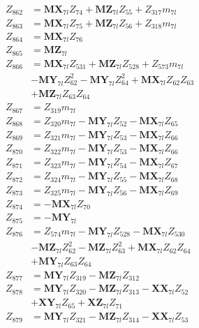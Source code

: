 \begin{multicols}{2}
\begin{align}
Z_{862} &= \mathbf{MX}_{7l}Z_{74} + \mathbf{MZ}_{7l}Z_{55} + Z_{317}m_{7l} \nonumber \\
Z_{863} &= \mathbf{MX}_{7l}Z_{75} + \mathbf{MZ}_{7l}Z_{56} + Z_{318}m_{7l} \nonumber \\
Z_{864} &= \mathbf{MX}_{7l}Z_{76} \nonumber \\
Z_{865} &= \mathbf{MZ}_{7l} \nonumber \\
Z_{866} &= \mathbf{MX}_{7l}Z_{531} + \mathbf{MZ}_{7l}Z_{528} + Z_{573}m_{7l}  \nonumber \\
&- \mathbf{MY}_{7l}Z_{62}^2 - \mathbf{MY}_{7l}Z_{64}^2 + \mathbf{MX}_{7l}Z_{62}Z_{63}  \nonumber \\
&+ \mathbf{MZ}_{7l}Z_{63}Z_{64} \nonumber \\
Z_{867} &= Z_{319}m_{7l} \nonumber \\
Z_{868} &= Z_{320}m_{7l} - \mathbf{MY}_{7l}Z_{52} - \mathbf{MX}_{7l}Z_{65} \nonumber \\
Z_{869} &= Z_{321}m_{7l} - \mathbf{MY}_{7l}Z_{53} - \mathbf{MX}_{7l}Z_{66} \nonumber \\
Z_{870} &= Z_{322}m_{7l} - \mathbf{MY}_{7l}Z_{53} - \mathbf{MX}_{7l}Z_{66} \nonumber \\
Z_{871} &= Z_{323}m_{7l} - \mathbf{MY}_{7l}Z_{54} - \mathbf{MX}_{7l}Z_{67} \nonumber \\
Z_{872} &= Z_{324}m_{7l} - \mathbf{MY}_{7l}Z_{55} - \mathbf{MX}_{7l}Z_{68} \nonumber \\
Z_{873} &= Z_{325}m_{7l} - \mathbf{MY}_{7l}Z_{56} - \mathbf{MX}_{7l}Z_{69} \nonumber \\
Z_{874} &= -\mathbf{MX}_{7l}Z_{70} \nonumber \\
Z_{875} &= -\mathbf{MY}_{7l} \nonumber \\
Z_{876} &= Z_{574}m_{7l} - \mathbf{MY}_{7l}Z_{528} - \mathbf{MX}_{7l}Z_{530}  \nonumber \\
&- \mathbf{MZ}_{7l}Z_{62}^2 - \mathbf{MZ}_{7l}Z_{63}^2 + \mathbf{MX}_{7l}Z_{62}Z_{64}  \nonumber \\
&+ \mathbf{MY}_{7l}Z_{63}Z_{64} \nonumber \\
Z_{877} &= \mathbf{MY}_{7l}Z_{319} - \mathbf{MZ}_{7l}Z_{312} \nonumber \\
Z_{878} &= \mathbf{MY}_{7l}Z_{320} - \mathbf{MZ}_{7l}Z_{313} - \mathbf{XX}_{7l}Z_{52}  \nonumber \\
&+ \mathbf{XY}_{7l}Z_{65} + \mathbf{XZ}_{7l}Z_{71} \nonumber \\
Z_{879} &= \mathbf{MY}_{7l}Z_{321} - \mathbf{MZ}_{7l}Z_{314} - \mathbf{XX}_{7l}Z_{53}  \nonumber \\

\end{align}
\end{multicols}
